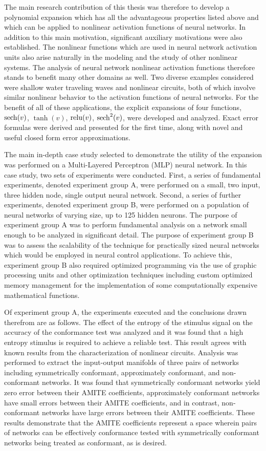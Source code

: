 The main research contribution of this thesis was therefore to develop a polynomial expansion which has all the advantageous properties listed above and which can be applied to nonlinear activation functions of neural networks.  In addition to this main motivation, significant auxiliary motivations were also established.  The nonlinear functions which are used in neural network activation units also arise naturally in the modeling and the study of other nonlinear systems.  The analysis of neural network nonlinear activation functions therefore stands to benefit many other domains as well.  Two diverse examples considered were shallow water traveling waves and nonlinear circuits, both of which involve similar nonlinear behavior to the activation functions of neural networks.  For the benefit of all of these applications, the explicit expansions of four functions, $\operatorname{sech}(v)$, $\tanh(v)$, $\operatorname{relu}(v)$, $\operatorname{sech}^2(v)$, were developed and analyzed.  Exact error formulas were derived and presented for the first time, along with novel and useful closed form error approximations.

The main in-depth case study selected to demonstrate the utility of the expansion was performed on a Multi-Layered Perceptron (MLP) neural network.  In this case study, two sets of experiments were conducted.  First, a series of fundamental experiments, denoted experiment group A, were performed on a small, two input, three hidden node, single output neural network.  Second, a series of further experiments, denoted experiment group B, were performed on a population of neural networks of varying size, up to 125 hidden neurons.  The purpose of experiment group A was to perform fundamental analysis on a network small enough to be analyzed in significant detail.  The purpose of experiment group B was to assess the scalability of the technique for practically sized neural networks which would be employed in neural control applications.  To achieve this, experiment group B also required optimized programming via the use of graphic processing units and other optimization techniques including custom optimized memory management for the implementation of some computationally expensive mathematical functions.

Of experiment group A, the experiments executed and the conclusions drawn therefrom are as follows.  The effect of the entropy of the stimulus signal on the accuracy of the conformance test was analyzed and it was found that a high entropy stimulus is required to achieve a reliable test.  This result agrees with known results from the characterization of nonlinear circuits.  Analysis was performed to extract the input-output manifolds of three pairs of networks including symmetrically conformant, approximately conformant, and non-conformant networks.  It was found that symmetrically conformant networks yield zero error between their AMITE coefficients, approximately conformant networks have small errors between their AMITE coefficients, and in contrast, non-conformant networks have large errors between their AMITE coefficients.  These results demonstrate that the AMITE coefficients represent a space wherein pairs of networks can be effectively conformance tested with symmetrically conformant networks being treated as conformant, as is desired.

